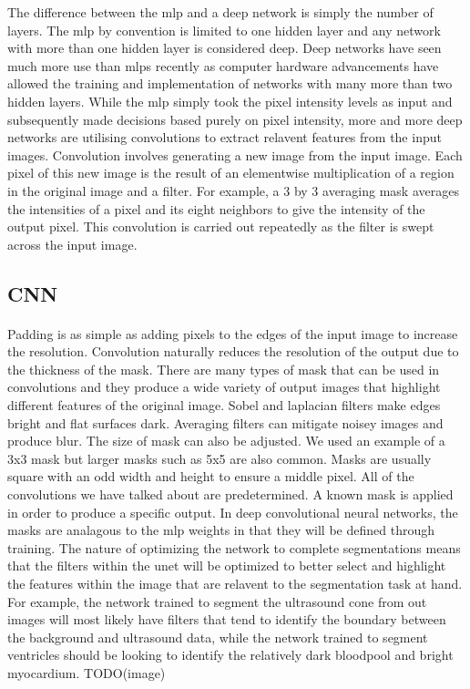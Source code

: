 \documentclass{article}
\begin{document}
{\par
The difference between the mlp and a deep network is simply the number of layers.
The mlp by convention is limited to one hidden layer and any network with more than one hidden layer is considered deep.
Deep networks have seen much more use than mlps recently as computer hardware advancements have allowed the training and implementation of networks with many more than two hidden layers.
While the mlp simply took the pixel intensity levels as input and subsequently made decisions based purely on pixel intensity, more and more deep networks are utilising convolutions to extract relavent features from the input images.
Convolution involves generating a new image from the input image. Each pixel of this new image is the result of an elementwise multiplication of a region in the original image and a filter.
For example, a 3 by 3 averaging mask averages the intensities of a pixel and its eight neighbors to give the intensity of the output pixel.
This convolution is carried out repeatedly as the filter is swept across the input image.
\subsection{CNN}
\paragraph{}

Padding is as simple as adding pixels to the edges of the input image to increase the resolution.
Convolution naturally reduces the resolution of the output due to the thickness of the mask.
There are many types of mask that can be used in convolutions and they produce a wide variety of output images that highlight different features of the original image.
Sobel and laplacian filters make edges bright and flat surfaces dark. Averaging filters can mitigate noisey images and produce blur.
The size of mask can also be adjusted. We used an example of a 3x3 mask but larger masks such as 5x5 are also common.
Masks are usually square with an odd width and height to ensure a middle pixel. All of the convolutions we have talked about are predetermined.
A known mask is applied in order to produce a specific output. In deep convolutional neural networks, the masks are analagous to the mlp weights in that they will be defined through training.
The nature of optimizing the network to complete segmentations means that the filters within the unet will be optimized to better select and highlight the features within the image that are relavent to the segmentation task at hand.
For example, the network trained to segment the ultrasound cone from out images will most likely have filters that tend to identify the boundary between the background and ultrasound data,
while the network trained to segment ventricles should be looking to identify the relatively dark bloodpool and bright myocardium.
TODO(image)
}
\end{document}
